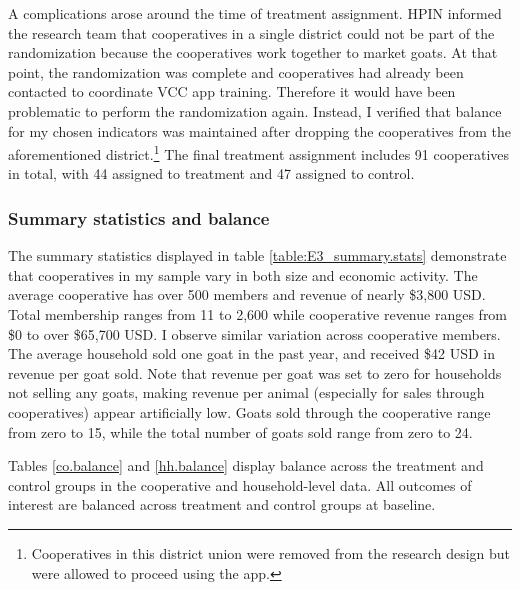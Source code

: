 \documentclass[11pt]{article}
\begin{document}
A complications arose around the time of treatment assignment. HPIN informed the research team that cooperatives in a single district could not be part of the randomization because the cooperatives work together to market goats. At that point, the randomization was complete and cooperatives had already been contacted to coordinate VCC app training. Therefore it would have been problematic to perform the randomization again. Instead, I verified that balance for my chosen indicators was maintained after dropping the cooperatives from the aforementioned district.\footnote{Cooperatives in this district union were removed from the research design but were allowed to proceed using the app.} The final treatment assignment includes 91 cooperatives in total, with 44 assigned to treatment and 47 assigned to control.


\subsubsection{Summary statistics and balance} \label{sec:E3_summary}
The summary statistics displayed in table \ref{table:E3_summary.stats} demonstrate that cooperatives in my sample vary in both size and economic activity. The average cooperative has over 500 members and revenue of nearly \$3,800 USD. Total membership ranges from 11 to 2,600 while cooperative revenue ranges from \$0 to over \$65,700 USD. I observe similar variation across cooperative members. The average household sold one goat in the past year, and received \$42 USD in revenue per goat sold. Note that revenue per goat was set to zero for households not selling any goats, making revenue per animal (especially for sales through cooperatives) appear artificially low. Goats sold through the cooperative range from zero to 15, while the total number of goats sold range from zero to 24. 

Tables \ref{co.balance} and \ref{hh.balance} display balance across the treatment and control groups in the cooperative and household-level data. All outcomes of interest are balanced across treatment and control groups at baseline. 
\end{document}
